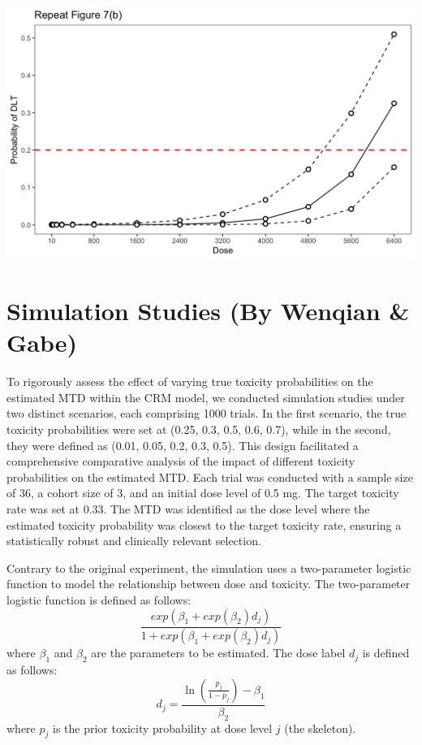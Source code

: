 \documentclass[
]{article}
\begin{document}
\includegraphics{fig.7.rep.dfcrm.png}

\hypertarget{simulation-studies-by-wenqian-gabe}{%
\section{Simulation Studies (By Wenqian \&
Gabe)}\label{simulation-studies-by-wenqian-gabe}}

To rigorously assess the effect of varying true toxicity probabilities
on the estimated MTD within the CRM model, we conducted simulation
studies under two distinct scenarios, each comprising 1000 trials. In
the first scenario, the true toxicity probabilities were set at (0.25,
0.3, 0.5, 0.6, 0.7), while in the second, they were defined as (0.01,
0.05, 0.2, 0.3, 0.5). This design facilitated a comprehensive
comparative analysis of the impact of different toxicity probabilities
on the estimated MTD. Each trial was conducted with a sample size of 36,
a cohort size of 3, and an initial dose level of 0.5 mg. The target
toxicity rate was set at 0.33. The MTD was identified as the dose level
where the estimated toxicity probability was closest to the target
toxicity rate, ensuring a statistically robust and clinically relevant
selection.

Contrary to the original experiment, the simulation uses a two-parameter
logistic function to model the relationship between dose and toxicity.
The two-parameter logistic function is defined as follows: \[
\frac{exp(\beta_1+exp(\beta_2)d_j)}{1+exp(\beta_1+exp(\beta_2)d_j)}
\] where \(\beta_1\) and \(\beta_2\) are the parameters to be estimated.
The dose label \(d_j\) is defined as follows: \[
d_j=\frac{\ln(\frac{p_j}{1-p_j})-\beta_1}{\beta_2}
\] where \(p_j\) is the prior toxicity probability at dose level \(j\)
(the skeleton).
\end{document}
